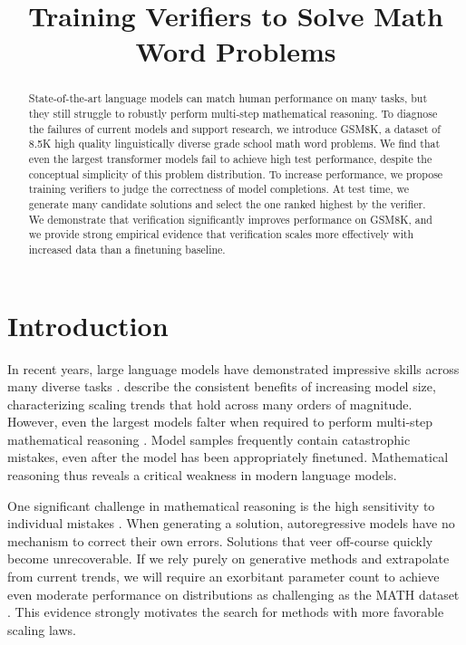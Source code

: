 \title{{ Training Verifiers to Solve Math Word Problems}}

\begin{abstract}
State-of-the-art language models can match human performance on many tasks, but they still struggle to robustly perform multi-step mathematical reasoning. To diagnose the failures of current models and support research, we introduce GSM8K, a dataset of 8.5K high quality linguistically diverse grade school math word problems. We find that even the largest transformer models fail to achieve high test performance, despite the conceptual simplicity of this problem distribution. To increase performance, we propose training verifiers to judge the correctness of model completions. At test time, we generate many candidate solutions and select the one ranked highest by the verifier. We demonstrate that verification significantly improves performance on GSM8K, and we provide strong empirical evidence that verification scales more effectively with increased data than a finetuning baseline.
\end{abstract}

\section{Introduction}

In recent years, large language models have demonstrated impressive skills across many diverse tasks \citep{wang2019superglue, brown2020language}. \cite{kaplan2020scaling} describe the consistent benefits of increasing model size, characterizing scaling trends that hold across many orders of magnitude. However, even the largest models falter when required to perform multi-step mathematical reasoning \citep{hendrycks2021measuring}. Model samples frequently contain catastrophic mistakes, even after the model has been appropriately finetuned. Mathematical reasoning thus reveals a critical weakness in modern language models.

One significant challenge in mathematical reasoning is the high sensitivity to individual mistakes \citep{shen2021generate}. When generating a solution, autoregressive models have no mechanism to correct their own errors. Solutions that veer off-course quickly become unrecoverable. If we rely purely on generative methods and extrapolate from current trends, we will require an exorbitant parameter count to achieve even moderate performance on distributions as challenging as the MATH dataset \citep{hendrycks2021measuring}. This evidence strongly motivates the search for methods with more favorable scaling laws.

